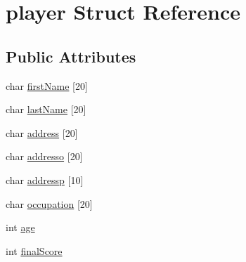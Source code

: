 \hypertarget{structplayer}{\section{player Struct Reference}
\label{structplayer}
}
\subsection*{Public Attributes}
\begin{DoxyCompactItemize}
\item 
char \hyperlink{structplayer_af5d399f16996f4710d7b1c443ef4937a}{first\+Name} \mbox{[}20\mbox{]}
\item 
char \hyperlink{structplayer_a83c4f28c58a5b8bab702fbec9b453a08}{last\+Name} \mbox{[}20\mbox{]}
\item 
char \hyperlink{structplayer_adda0593a31115af3d2fc7712b3c1ec06}{address} \mbox{[}20\mbox{]}
\item 
char \hyperlink{structplayer_a0fc4babe259e876b9efc3467d40e5355}{addresso} \mbox{[}20\mbox{]}
\item 
char \hyperlink{structplayer_ae39f0c21bd9675a3ed588e27dd6e56b1}{addressp} \mbox{[}10\mbox{]}
\item 
char \hyperlink{structplayer_ae14113611c63ca2782696f0048161f3b}{occupation} \mbox{[}20\mbox{]}
\item 
int \hyperlink{structplayer_aacfd39287461fb570132e857307cff87}{age}
\item 
int \hyperlink{structplayer_a8ac3c82bb8b48293fd19a0e82771ed61}{final\+Score}
\end{DoxyCompactItemize}


